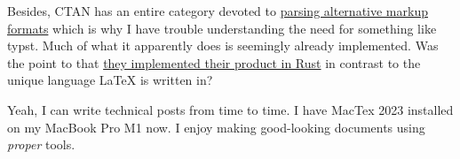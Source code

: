 Besides, CTAN has an entire category devoted to
\href{https://ctan.org/topic/markup}{parsing alternative markup formats}
which is why I have trouble understanding the need for something like
typst. Much of what it apparently does is seemingly already implemented.
Was the point to that \href{https://github.com/typst/typst}{they
implemented their product in Rust} in contrast to the unique language
LaTeX is written in?

Yeah, I can write technical posts from time to time. I have MacTex 2023
installed on my MacBook Pro M1 now. I enjoy making good-looking
documents using \emph{proper} tools.
